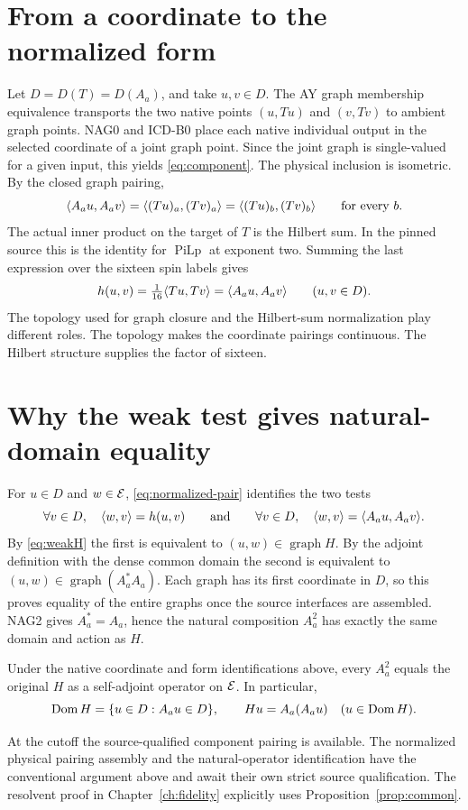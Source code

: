 \section{From a coordinate to the normalized form}
Let $D=D(T)=D(A_a)$, and take $u,v\in D$. The AY graph membership equivalence transports the two native points $(u,Tu)$ and $(v,Tv)$ to ambient graph points. NAG0 and ICD-B0 place each native individual output in the selected coordinate of a joint graph point. Since the joint graph is single-valued for a given input, this yields \eqref{eq:component}. The physical inclusion is isometric. By the closed graph pairing,
\[
 \langle A_a u,A_a v\rangle=\langle (Tu)_a,(Tv)_a\rangle
 =\langle (Tu)_b,(Tv)_b\rangle\qquad\text{for every }b.
\]
The actual inner product on the target of $T$ is the Hilbert sum. In the pinned source this is the identity for $\operatorname{PiLp}$ at exponent two. Summing the last expression over the sixteen spin labels gives
\begin{equation}
 h(u,v)=\tfrac1{16}\langle Tu,Tv\rangle=\langle A_a u,A_a v\rangle \qquad(u,v\in D).
 \label{eq:normalized-pair}
\end{equation}
The topology used for graph closure and the Hilbert-sum normalization play different roles. The topology makes the coordinate pairings continuous. The Hilbert structure supplies the factor of sixteen.

\section{Why the weak test gives natural-domain equality}
For $u\in D$ and $w\in\mathcal E$, \eqref{eq:normalized-pair} identifies the two tests
\[
 \forall v\in D,\quad \langle w,v\rangle=h(u,v)
 \qquad\text{and}\qquad
 \forall v\in D,\quad \langle w,v\rangle=\langle A_a u,A_a v\rangle.
\]
By \eqref{eq:weakH} the first is equivalent to $(u,w)\in\operatorname{graph} H$. By the adjoint definition with the dense common domain the second is equivalent to $(u,w)\in\operatorname{graph}(A_a^\ast A_a)$. Each graph has its first coordinate in $D$, so this proves equality of the entire graphs once the source interfaces are assembled. NAG2 gives $A_a^\ast=A_a$, hence the natural composition $A_a^2$ has exactly the same domain and action as $H$.

\begin{proposition}\label{prop:common}
Under the native coordinate and form identifications above, every $A_a^2$ equals the original $H$ as a self-adjoint operator on $\mathcal E$. In particular,
\[
 \operatorname{Dom} H=\{u\in D:A_a u\in D\},\qquad
 Hu=A_a(A_a u)\quad (u\in\operatorname{Dom} H).
\]
\end{proposition}
At the cutoff the source-qualified component pairing is available. The normalized physical pairing assembly and the natural-operator identification have the conventional argument above and await their own strict source qualification. The resolvent proof in Chapter~\ref{ch:fidelity} explicitly uses Proposition~\ref{prop:common}.
